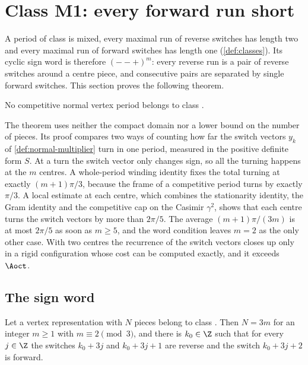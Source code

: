 \section{Class M1: every forward run short}\label{sec:short-runs}

A period of class  is mixed, every maximal run of reverse switches has length two and
every maximal run of forward switches has length one (\cref{def:classes}). Its cyclic sign word is
therefore $(--+)^m$: every reverse run is a pair of reverse switches around a centre piece, and
consecutive pairs are separated by single forward switches. This section proves the following
theorem.

\begin{theorem}\label{thm:class-M1}
  No competitive normal vertex period belongs to class .
\end{theorem}

The theorem uses neither the compact domain nor a lower bound on the number of pieces. Its proof
compares two ways of counting how far the switch vectors $y_k$ of \cref{def:normal-multiplier}
turn in one period, measured in the positive definite form $S$. At a turn the switch vector only
changes sign, so all the turning happens at the $m$ centres. A whole-period winding identity fixes
the total turning at exactly $(m+1)\pi/3$, because the frame of a competitive period turns by
exactly $\pi/3$. A local estimate at each centre, which combines the stationarity identity, the
Gram identity and the competitive cap on the Casimir $\gamma^2$, shows that each centre turns the
switch vectors by more than $2\pi/5$. The average $(m+1)\pi/(3m)$ is at most $2\pi/5$ as soon as
$m\ge5$, and the word condition leaves $m=2$ as the only other case. With two centres the
recurrence of the switch vectors closes up only in a rigid configuration whose cost can be computed
exactly, and it exceeds $\Aoct$.

\subsection{The sign word}

\begin{lemma}\label{lem:m1-pattern}
  Let a vertex representation with $N$ pieces belong to class . Then $N=3m$ for an integer
  $m\ge1$ with $m\equiv2\pmod 3$, and there is $k_0\in\Z$ such that for every $j\in\Z$ the
  switches $k_0+3j$ and $k_0+3j+1$ are reverse and the switch $k_0+3j+2$ is forward.
\end{lemma}

